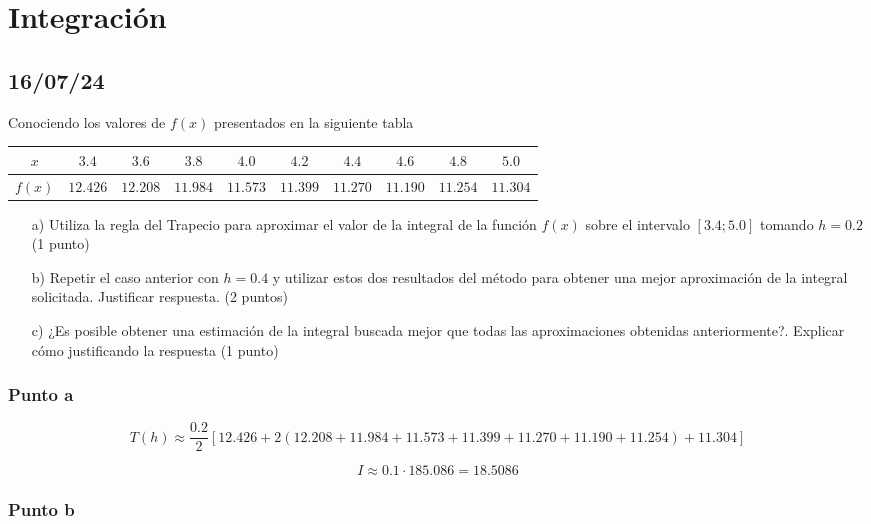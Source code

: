 \section{Integración}

\subsection{16/07/24}

Conociendo los valores de $f(x)$ presentados en la siguiente tabla

\begin{center}
\begin{tabular}{ |c|c|c|c|c|c|c|c|c|c| } 
 \hline
 $x$ & $3.4$ & $3.6$ & $3.8$ & $4.0$& $4.2$ & $4.4$ & $4.6$ & $4.8$ & $5.0$ \\ 
 \hline
 $f(x)$ & $12.426$ & $12.208$ & $11.984$ & $11.573$ & $11.399$ & $11.270$ & $11.190$ & $11.254$ & $11.304$ \\ 
 \hline
\end{tabular}
\end{center}



\begin{enumerate}
    \item[a)]Utiliza la regla del Trapecio para aproximar el valor de la integral de la función $f(x)$ sobre el intervalo $[3.4 ; 5.0]$ tomando $h = 0.2$ (1 punto)
    \item[b)] Repetir el caso anterior con $h = 0.4$ y utilizar estos dos resultados del método para obtener una mejor aproximación de la integral solicitada. Justificar respuesta. (2 puntos)
    \item[c)] ¿Es posible obtener una estimación de la integral buscada mejor que todas las aproximaciones obtenidas anteriormente?. Explicar cómo justificando la respuesta (1 punto)
\end{enumerate}


\subsubsection{Punto a}

\[
T(h) \approx \frac{0.2}{2} \left[ 12.426 + 2 \left(12.208 + 11.984 + 11.573 + 11.399 + 11.270 + 11.190 + 11.254 \right) + 11.304 \right]
\]

\[
I \approx 0.1 \cdot 185.086 = 18.5086
\]

 \subsubsection{Punto b}
 
